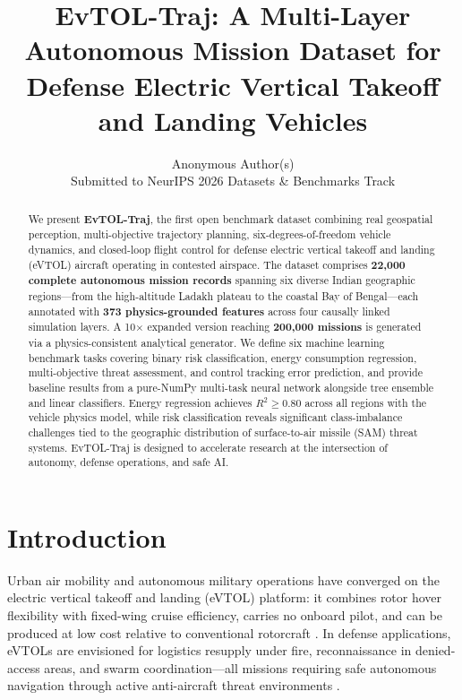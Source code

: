 ﻿\documentclass{article}
\title{EvTOL-Traj: A Multi-Layer Autonomous Mission Dataset for\\
Defense Electric Vertical Takeoff and Landing Vehicles}
\author{%
  Anonymous Author(s)\\
  Submitted to NeurIPS 2026 Datasets \& Benchmarks Track
}
\begin{document}
\maketitle

\begin{abstract}
We present \textbf{EvTOL-Traj}, the first open benchmark dataset combining
real geospatial perception, multi-objective trajectory planning, six-degrees-of-freedom
vehicle dynamics, and closed-loop flight control for defense electric vertical
takeoff and landing (eVTOL) aircraft operating in contested airspace.
The dataset comprises \textbf{22{,}000 complete autonomous mission records}
spanning six diverse Indian geographic regions---from the high-altitude Ladakh
plateau to the coastal Bay of Bengal---each annotated with \textbf{373 physics-grounded
features} across four causally linked simulation layers.
A 10$\times$ expanded version reaching \textbf{200{,}000 missions} is
generated via a physics-consistent analytical generator.
We define six machine learning benchmark tasks covering binary risk classification,
energy consumption regression, multi-objective threat assessment, and control
tracking error prediction, and provide baseline results from a pure-NumPy
multi-task neural network alongside tree ensemble and linear classifiers.
Energy regression achieves $R^2 \geq 0.80$ across all regions with the
vehicle physics model, while risk classification reveals significant class-imbalance
challenges tied to the geographic distribution of surface-to-air missile
(SAM) threat systems. EvTOL-Traj is designed to accelerate research at the
intersection of autonomy, defense operations, and safe AI.
\end{abstract}

\section{Introduction}
\label{sec:intro}

Urban air mobility and autonomous military operations have converged on the
electric vertical takeoff and landing (eVTOL) platform: it combines rotor
hover flexibility with fixed-wing cruise efficiency, carries no onboard pilot,
and can be produced at low cost relative to conventional rotorcraft
\citep{garrow2021urban,johnson2020nasa}.
In defense applications, eVTOLs are envisioned for logistics resupply under
fire, reconnaissance in denied-access areas, and swarm coordination---all
missions requiring safe autonomous navigation through active anti-aircraft
threat environments \citep{dod2022autonomy}.
\end{document}
